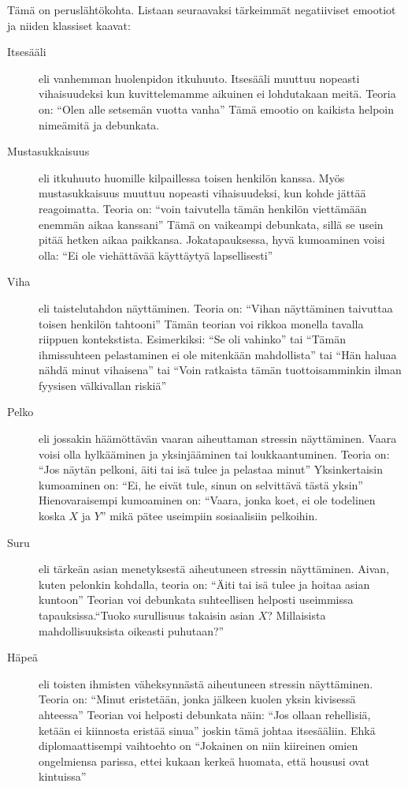 Tämä on peruslähtökohta. Listaan seuraavaksi tärkeimmät negatiiviset emootiot ja niiden klassiset kaavat:
\begin{description}
\item[Itsesääli] eli vanhemman huolenpidon itkuhuuto. Itsesääli muuttuu nopeasti vihaisuudeksi kun kuvittelemamme aikuinen ei lohdutakaan meitä. Teoria on: ``Olen alle setsemän vuotta vanha'' Tämä emootio on kaikista helpoin nimeämitä ja debunkata.
\item[Mustasukkaisuus] eli itkuhuuto huomille kilpaillessa toisen henkilön kanssa. Myös mustasukkaisuus muuttuu nopeasti vihaisuudeksi, kun kohde jättää reagoimatta. Teoria on: ``voin taivutella tämän henkilön viettämään enemmän aikaa kanssani'' Tämä on vaikeampi debunkata, sillä se usein pitää hetken aikaa paikkansa. Jokatapauksessa, hyvä kumoaminen voisi olla: ``Ei ole viehättävää käyttäytyä lapsellisesti''
\item[Viha] eli taistelutahdon näyttäminen. Teoria on: ``Vihan näyttäminen taivuttaa toisen henkilön tahtooni'' Tämän teorian voi rikkoa monella tavalla riippuen kontekstista. Esimerkiksi: ``Se oli vahinko'' tai ``Tämän ihmissuhteen pelastaminen ei ole mitenkään mahdollista'' tai ``Hän haluaa nähdä minut vihaisena'' tai ``Voin ratkaista tämän tuottoisamminkin ilman fyysisen välkivallan riskiä''
\item[Pelko] eli jossakin häämöttävän vaaran aiheuttaman stressin näyttäminen. Vaara voisi olla hylkääminen ja yksinjääminen tai loukkaantuminen. Teoria on: ``Jos näytän pelkoni, äiti tai isä tulee ja pelastaa minut'' Yksinkertaisin kumoaminen on: ``Ei, he eivät tule, sinun on selvittävä tästä yksin'' Hienovaraisempi kumoaminen on: ``Vaara, jonka koet, ei ole todelinen koska \(X\) ja \(Y\)\vmq{,}'' mikä pätee useimpiin sosiaalisiin pelkoihin.
\item[Suru] eli tärkeän asian menetyksestä aiheutuneen stressin näyttäminen. Aivan, kuten pelonkin kohdalla, teoria on: ``Äiti tai isä tulee ja hoitaa asian kuntoon'' Teorian voi debunkata suhteellisen helposti useimmissa tapauksissa.``Tuoko surullisuus takaisin asian \(X\)? Millaisista mahdollisuuksista oikeasti puhutaan?''
\item[Häpeä] eli toisten ihmisten väheksynnästä aiheutuneen stressin näyttäminen. Teoria on: ``Minut eristetään, jonka jälkeen kuolen yksin kivisessä ahteessa'' Teorian voi helposti debunkata näin: ``Jos ollaan rehellisiä, ketään ei kiinnosta eristää sinua\vmq{,}'' joskin tämä johtaa itsesääliin. Ehkä diplomaattisempi vaihtoehto on ``Jokainen on niin kiireinen omien ongelmiensa parissa, ettei kukaan kerkeä huomata, että housusi ovat kintuissa''

\end{description}
